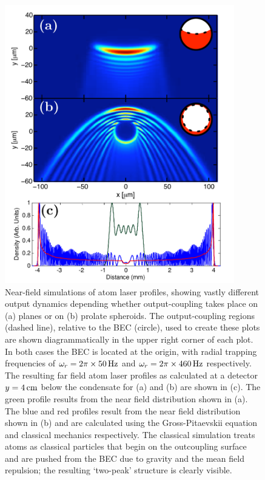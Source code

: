 \begin{figure}
    \centering
    \includegraphics[width=10cm]{HeliumTransverseProfile}
    \caption{Near-field simulations of atom laser profiles, showing vastly different output dynamics depending whether output-coupling takes place on (a) planes or on (b) prolate spheroids.  The output-coupling regions (dashed line), relative to the BEC (circle), used to create these plots are shown diagrammatically in the upper right corner of each plot.  In both cases the BEC is located at the origin, with radial trapping frequencies of $\omega_r = 2 \pi \times \unit[50]{Hz}$ and $\omega_r = 2 \pi \times \unit[460]{Hz}$ respectively.  The resulting far field atom laser profiles as calculated at a detector $y=\unit[4]{cm}$ below the condensate for (a) and (b) are shown in (c).  The green profile results from the near field distribution shown in (a).  The blue and red profiles result from the near field distribution shown in (b) and are calculated using the Gross-Pitaevskii equation and classical mechanics respectively.  The classical simulation treats atoms as classical particles that begin on the outcoupling surface and are pushed from the BEC due to gravity and the mean field repulsion; the resulting `two-peak' structure is clearly visible.}
    \label{BackgroundTheory:HeliumTransverseProfile}
\end{figure}

